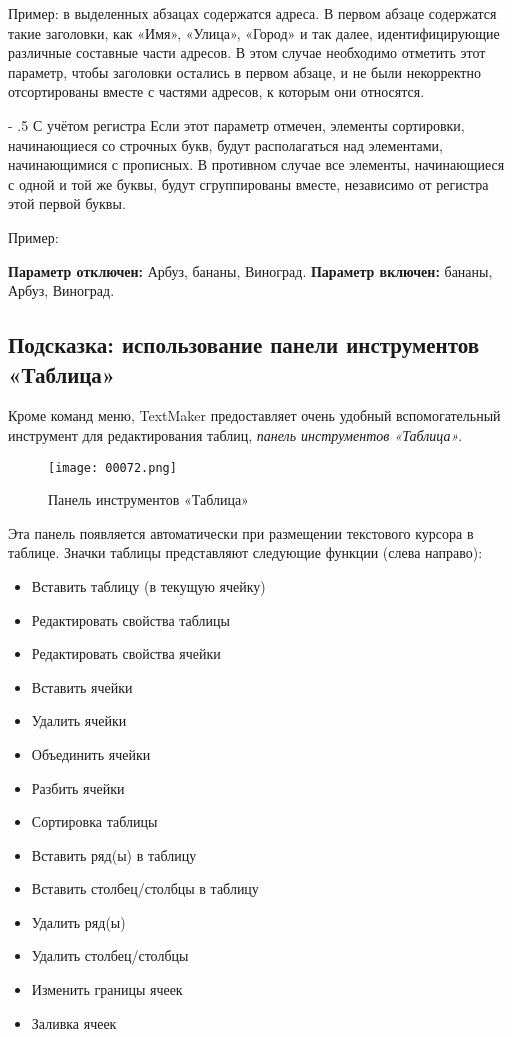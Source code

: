 \documentclass[a4paper,10pt]{article}
\makeatletter
\renewcommand\paragraph{%
   \@startsection{paragraph}{4}{0mm}%
      {-\baselineskip}%
      {.5\baselineskip}%
      {\normalfont\normalsize\bfseries}}
\makeatother
\begin{document}
Пример: в выделенных абзацах содержатся адреса. В первом абзаце содержатся такие заголовки, как «Имя», «Улица», «Город» и так далее, идентифицирующие различные составные части адресов. В этом случае необходимо отметить этот параметр, чтобы заголовки остались в первом абзаце, и не были некорректно отсортированы вместе с частями адресов, к которым они относятся.

\paragraph{С учётом регистра}
Если этот параметр отмечен, элементы сортировки, начинающиеся со строчных букв, будут располагаться над элементами, начинающимися с прописных. В противном случае все элементы, начинающиеся с одной и той же буквы, будут сгруппированы вместе, независимо от регистра этой первой буквы.

Пример:

\textbf{Параметр отключен:} Арбуз, бананы, Виноград. \textbf{Параметр включен:} бананы, Арбуз, Виноград.

\subsection{Подсказка: использование панели инструментов «Таблица»}
Кроме команд меню, TextMaker предоставляет очень удобный вспомогательный инструмент для редактирования таблиц, \textit{панель инструментов «Таблица»}.

\begin{figure}[ht]
\texttt{[image: 00072.png]}
\centering
\caption{Панель инструментов «Таблица»}
\end{figure}

Эта панель появляется автоматически при размещении текстового курсора в таблице. Значки таблицы представляют следующие функции (слева направо):

\begin{itemize}
 \item Вставить таблицу (в текущую ячейку)
 \item Редактировать свойства таблицы
 \item Редактировать свойства ячейки
 \item Вставить ячейки
 \item Удалить ячейки
 \item Объединить ячейки
 \item Разбить ячейки
 \item Сортировка таблицы
 \item Вставить ряд(ы) в таблицу
 \item Вставить столбец/столбцы в таблицу
 \item Удалить ряд(ы)
 \item Удалить столбец/столбцы
 \item Изменить границы ячеек
 \item Заливка ячеек
\end{itemize}
\end{document}
